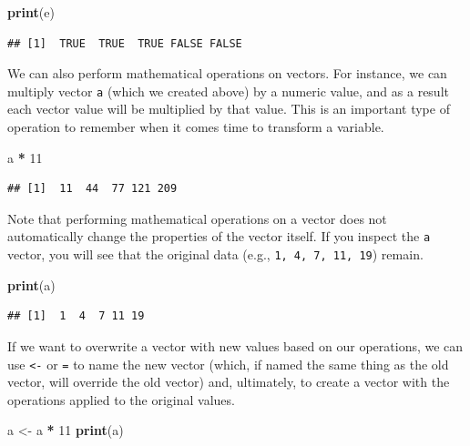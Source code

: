 \documentclass[]{book}
\newenvironment{Shaded}{\begin{snugshade}}{\end{snugshade}}
\newcommand{\KeywordTok}[1]{\textcolor[rgb]{0.13,0.29,0.53}{\textbf{#1}}}
\newcommand{\DecValTok}[1]{\textcolor[rgb]{0.00,0.00,0.81}{#1}}
\newcommand{\StringTok}[1]{\textcolor[rgb]{0.31,0.60,0.02}{#1}}
\newcommand{\OperatorTok}[1]{\textcolor[rgb]{0.81,0.36,0.00}{\textbf{#1}}}
\newcommand{\NormalTok}[1]{#1}
\begin{document}
\begin{Shaded}
\begin{Highlighting}[]
\KeywordTok{print}\NormalTok{(e)}
\end{Highlighting}
\end{Shaded}

\begin{verbatim}
## [1]  TRUE  TRUE  TRUE FALSE FALSE
\end{verbatim}

We can also perform mathematical operations on vectors. For instance, we
can multiply vector \texttt{a} (which we created above) by a numeric
value, and as a result each vector value will be multiplied by that
value. This is an important type of operation to remember when it comes
time to transform a variable.

\begin{Shaded}
\begin{Highlighting}[]
\NormalTok{a }\OperatorTok{*}\StringTok{ }\DecValTok{11}
\end{Highlighting}
\end{Shaded}

\begin{verbatim}
## [1]  11  44  77 121 209
\end{verbatim}

Note that performing mathematical operations on a vector does not
automatically change the properties of the vector itself. If you inspect
the \texttt{a} vector, you will see that the original data (e.g.,
\texttt{1,\ 4,\ 7,\ 11,\ 19}) remain.

\begin{Shaded}
\begin{Highlighting}[]
\KeywordTok{print}\NormalTok{(a)}
\end{Highlighting}
\end{Shaded}

\begin{verbatim}
## [1]  1  4  7 11 19
\end{verbatim}

If we want to overwrite a vector with new values based on our
operations, we can use \texttt{\textless{}-} or \texttt{=} to name the
new vector (which, if named the same thing as the old vector, will
override the old vector) and, ultimately, to create a vector with the
operations applied to the original values.

\begin{Shaded}
\begin{Highlighting}[]
\NormalTok{a <-}\StringTok{ }\NormalTok{a }\OperatorTok{*}\StringTok{ }\DecValTok{11}
\KeywordTok{print}\NormalTok{(a)}
\end{Highlighting}
\end{Shaded}
\end{document}
